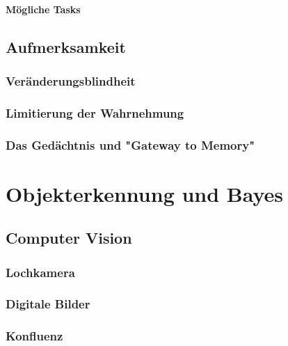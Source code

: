 \documentclass[a4paper, 11pt, accentcolor = tud3b]{tudreport}
\begin{document}
				\subsubsection{Mögliche Tasks} %

		\section{Aufmerksamkeit} %

			\subsection{Veränderungsblindheit} %

			\subsection{Limitierung der Wahrnehmung} %

			\subsection{Das Gedächtnis und "Gateway to Memory"} %

	\chapter{Objekterkennung und Bayes} %

		\section{Computer Vision} %

			\subsection{Lochkamera} %

			\subsection{Digitale Bilder} %

			\subsection{Konfluenz} %
\end{document}
